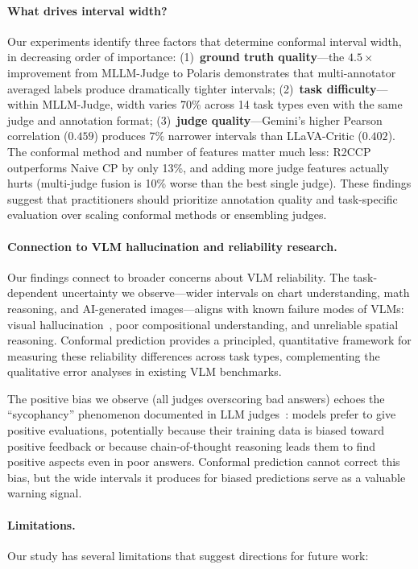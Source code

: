 \documentclass{article}
\begin{document}
\paragraph{What drives interval width?}
Our experiments identify three factors that determine conformal interval width, in decreasing order of importance: (1)~\textbf{ground truth quality}---the $4.5\times$ improvement from MLLM-Judge to Polaris demonstrates that multi-annotator averaged labels produce dramatically tighter intervals; (2)~\textbf{task difficulty}---within MLLM-Judge, width varies 70\% across 14 task types even with the same judge and annotation format; (3)~\textbf{judge quality}---Gemini's higher Pearson correlation ($0.459$) produces 7\% narrower intervals than LLaVA-Critic ($0.402$). The conformal method and number of features matter much less: R2CCP outperforms Naive CP by only 13\%, and adding more judge features actually hurts (multi-judge fusion is 10\% worse than the best single judge). These findings suggest that practitioners should prioritize annotation quality and task-specific evaluation over scaling conformal methods or ensembling judges.

\paragraph{Connection to VLM hallucination and reliability research.}
Our findings connect to broader concerns about VLM reliability. The task-dependent uncertainty we observe---wider intervals on chart understanding, math reasoning, and AI-generated images---aligns with known failure modes of VLMs: visual hallucination~\citep{li2024vlrewardbench}, poor compositional understanding, and unreliable spatial reasoning. Conformal prediction provides a principled, quantitative framework for measuring these reliability differences across task types, complementing the qualitative error analyses in existing VLM benchmarks.

The positive bias we observe (all judges overscoring bad answers) echoes the ``sycophancy'' phenomenon documented in LLM judges~\citep{zheng2023judging}: models prefer to give positive evaluations, potentially because their training data is biased toward positive feedback or because chain-of-thought reasoning leads them to find positive aspects even in poor answers. Conformal prediction cannot correct this bias, but the wide intervals it produces for biased predictions serve as a valuable warning signal.

\paragraph{Limitations.}
Our study has several limitations that suggest directions for future work:
\end{document}

